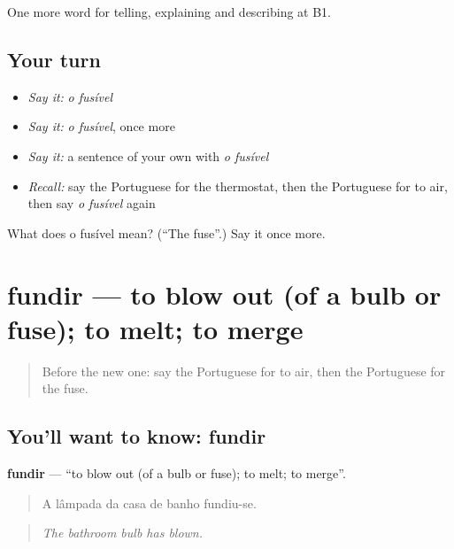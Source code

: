\begin{grammarlens}[title={What you've built}]
One more word for telling, explaining and describing at B1.
\end{grammarlens}

\subsection*{Your turn}
\begin{itemize}
\raggedright
  \item \emph{Say it:} \emph{o fusível}
  \item \emph{Say it:} \emph{o fusível}, once more
  \item \emph{Say it:} a sentence of your own with \emph{o fusível}
  \item \emph{Recall:} say the Portuguese for the thermostat, then the Portuguese for to air, then say \emph{o fusível} again
\end{itemize}

\begin{tcolorbox}[breakable,colback=teal!4,colframe=teal!35!black,title={Before you move on}]
What does o fusível mean? (\textquotedblleft{}The fuse\textquotedblright{}.) Say it once more.
\end{tcolorbox}
\section[fundir]{fundir — to blow out (of a bulb or fuse); to melt; to merge}

\label{lesson:PT-C432-fundir}



\begin{quote}
Before the new one: say the Portuguese for to air, then the Portuguese for the fuse.
\end{quote}

\subsection*{You'll want to know: fundir}
\textbf{fundir} — \textquotedblleft{}to blow out (of a bulb or fuse); to melt; to merge\textquotedblright{}.

\begin{quote}
A lâmpada da casa de banho fundiu-se.
\end{quote}

\begin{quote}
\emph{The bathroom bulb has blown.}
\end{quote}

